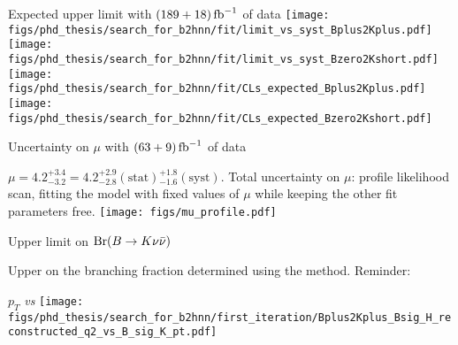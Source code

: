 \begin{frame}[noframenumbering]{Expected upper limit with $(189+18)\mbox{\,fb}^{-1}$ of data}
\texttt{[image: figs/phd\_thesis/search\_for\_b2hnn/fit/limit\_vs\_syst\_Bplus2Kplus.pdf]}
\texttt{[image: figs/phd\_thesis/search\_for\_b2hnn/fit/limit\_vs\_syst\_Bzero2Kshort.pdf]}
\texttt{[image: figs/phd\_thesis/search\_for\_b2hnn/fit/CLs\_expected\_Bplus2Kplus.pdf]}
\texttt{[image: figs/phd\_thesis/search\_for\_b2hnn/fit/CLs\_expected\_Bzero2Kshort.pdf]}
\end{frame}
\begin{frame}[noframenumbering]{Uncertainty on $\mu$ with $(63+9)\mbox{\,fb}^{-1}$ of data}
\bi
\item {\small $\mu = 4.2^{+3.4}_{-3.2} = 4.2^{+2.9}_{-2.8}(\mathrm{stat}){}^{+1.8}_{-1.6}(\mathrm{syst})$.}
\itemii Total uncertainty on $\mu$: profile likelihood scan, fitting the model with fixed values of $\mu$ while keeping the other fit parameters free.
\ei
\vspace{0.5cm}
\centering
\texttt{[image: figs/mu\_profile.pdf]}
\end{frame}
\begin{frame}[noframenumbering]{Upper limit on $\mathrm{Br}(B\rightarrow K\nu\bar{\nu})$}
\bi
\item Upper on the branching fraction determined using the \CLs method.
\itemiii Reminder:
\bi
{}
\ei
\ei
\vspace{0.5cm}


\end{frame}
\begin{frame}[noframenumbering]{$p_T$ \textit{vs} \qrec}
\centering
\texttt{[image: figs/phd\_thesis/search\_for\_b2hnn/first\_iteration/Bplus2Kplus\_Bsig\_H\_reconstructed\_q2\_vs\_B\_sig\_K\_pt.pdf]}
\end{frame}
